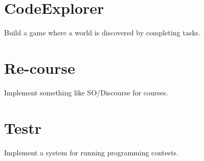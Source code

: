 \documentclass[a4paper]{article}
\newcommand{\task}[1]{\newpage\section{#1}}
\begin{document}
\begin{titlepage}
	
\end{titlepage}




\task{CodeExplorer}
Build a game where a world is discovered by completing tasks.

\task{Re-course}
Implement something like SO/Discourse for courses.

\task{Testr}
Implement a system for running programming contests.
\end{document}
